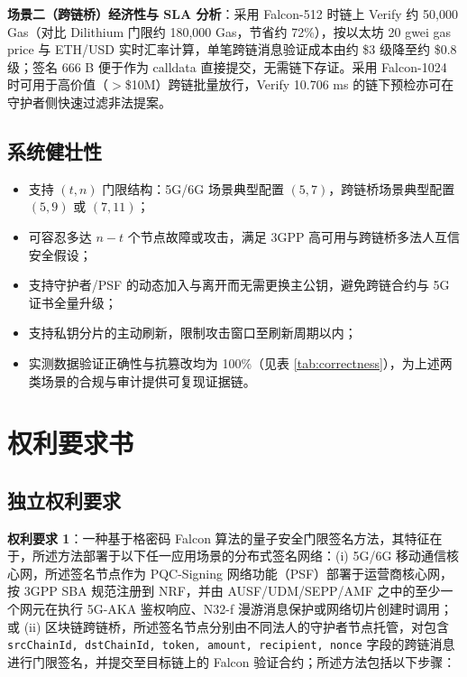 \documentclass[12pt,a4paper]{article}
\begin{document}
\textbf{场景二（跨链桥）经济性与 SLA 分析}：采用 Falcon-512 时链上 Verify 约 50,000 Gas（对比 Dilithium 门限约 180,000 Gas，节省约 72\%），按以太坊 20 gwei gas price 与 ETH/USD 实时汇率计算，单笔跨链消息验证成本由约 \$3 级降至约 \$0.8 级；签名 666 B 便于作为 calldata 直接提交，无需链下存证。采用 Falcon-1024 时可用于高价值（$>$\$10M）跨链批量放行，Verify 10.706 ms 的链下预检亦可在守护者侧快速过滤非法提案。

\subsection{系统健壮性}

\begin{itemize}
    \item 支持 $(t, n)$ 门限结构：5G/6G 场景典型配置 $(5, 7)$，跨链桥场景典型配置 $(5, 9)$ 或 $(7, 11)$；
    \item 可容忍多达 $n - t$ 个节点故障或攻击，满足 3GPP 高可用与跨链桥多法人互信安全假设；
    \item 支持守护者/PSF 的动态加入与离开而无需更换主公钥，避免跨链合约与 5G 证书全量升级；
    \item 支持私钥分片的主动刷新，限制攻击窗口至刷新周期以内；
    \item 实测数据验证正确性与抗篡改均为 100\%（见表 \ref{tab:correctness}），为上述两类场景的合规与审计提供可复现证据链。
\end{itemize}

\section{权利要求书}

\subsection{独立权利要求}

\textbf{权利要求 1}：一种基于格密码 Falcon 算法的量子安全门限签名方法，其特征在于，所述方法部署于以下任一应用场景的分布式签名网络：(i) 5G/6G 移动通信核心网，所述签名节点作为 PQC-Signing 网络功能（PSF）部署于运营商核心网，按 3GPP SBA 规范注册到 NRF，并由 AUSF/UDM/SEPP/AMF 之中的至少一个网元在执行 5G-AKA 鉴权响应、N32-f 漫游消息保护或网络切片创建时调用；或 (ii) 区块链跨链桥，所述签名节点分别由不同法人的守护者节点托管，对包含 \texttt{srcChainId, dstChainId, token, amount, recipient, nonce} 字段的跨链消息进行门限签名，并提交至目标链上的 Falcon 验证合约；所述方法包括以下步骤：
\end{document}
